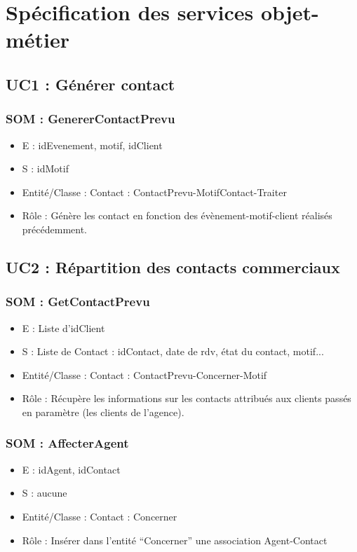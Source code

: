 \section{Spécification des services objet-métier}
\subsection{UC1 : Générer contact}
\subsubsection{SOM : GenererContactPrevu}
	\begin{itemize}
		\item E : idEvenement, motif, idClient
		\item S : idMotif
		\item Entité/Classe : Contact : ContactPrevu-MotifContact-Traiter
		\item Rôle : Génère les contact en fonction des évènement-motif-client réalisés
	précédemment.
	\end{itemize}



\subsection{UC2 : Répartition des contacts commerciaux}
\subsubsection{SOM : GetContactPrevu}
	\begin{itemize}
		\item E : Liste d’idClient
		\item S : Liste de Contact : idContact, date de rdv, état du contact, motif...
		\item Entité/Classe : Contact : ContactPrevu-Concerner-Motif
		\item Rôle : Récupère les informations sur les contacts attribués aux clients passés en
	paramètre (les clients de l’agence).
	\end{itemize}

\subsubsection{SOM : AffecterAgent}
	\begin{itemize}
		\item E : idAgent, idContact
		\item S : aucune
		\item Entité/Classe : Contact : Concerner
		\item Rôle : Insérer dans l’entité “Concerner” une association Agent-Contact
	\end{itemize}



